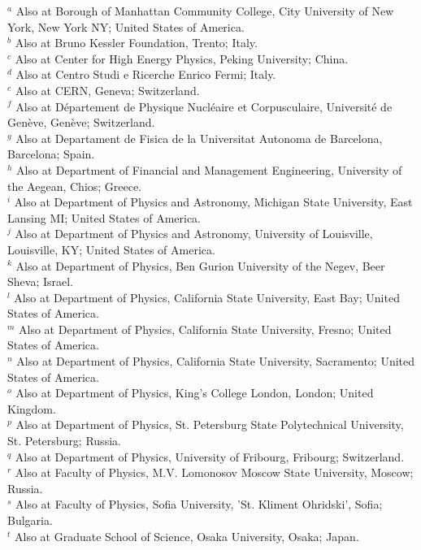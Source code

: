 \begin{flushleft}
$^{a}$ Also at Borough of Manhattan Community College, City University of New York, New York NY; United States of America.\\
$^{b}$ Also at Bruno Kessler Foundation, Trento; Italy.\\
$^{c}$ Also at Center for High Energy Physics, Peking University; China.\\
$^{d}$ Also at Centro Studi e Ricerche Enrico Fermi; Italy.\\
$^{e}$ Also at CERN, Geneva; Switzerland.\\
$^{f}$ Also at D\'epartement de Physique Nucl\'eaire et Corpusculaire, Universit\'e de Gen\`eve, Gen\`eve; Switzerland.\\
$^{g}$ Also at Departament de Fisica de la Universitat Autonoma de Barcelona, Barcelona; Spain.\\
$^{h}$ Also at Department of Financial and Management Engineering, University of the Aegean, Chios; Greece.\\
$^{i}$ Also at Department of Physics and Astronomy, Michigan State University, East Lansing MI; United States of America.\\
$^{j}$ Also at Department of Physics and Astronomy, University of Louisville, Louisville, KY; United States of America.\\
$^{k}$ Also at Department of Physics, Ben Gurion University of the Negev, Beer Sheva; Israel.\\
$^{l}$ Also at Department of Physics, California State University, East Bay; United States of America.\\
$^{m}$ Also at Department of Physics, California State University, Fresno; United States of America.\\
$^{n}$ Also at Department of Physics, California State University, Sacramento; United States of America.\\
$^{o}$ Also at Department of Physics, King's College London, London; United Kingdom.\\
$^{p}$ Also at Department of Physics, St. Petersburg State Polytechnical University, St. Petersburg; Russia.\\
$^{q}$ Also at Department of Physics, University of Fribourg, Fribourg; Switzerland.\\
$^{r}$ Also at Faculty of Physics, M.V. Lomonosov Moscow State University, Moscow; Russia.\\
$^{s}$ Also at Faculty of Physics, Sofia University, 'St. Kliment Ohridski', Sofia; Bulgaria.\\
$^{t}$ Also at Graduate School of Science, Osaka University, Osaka; Japan.\\

\end{flushleft}

